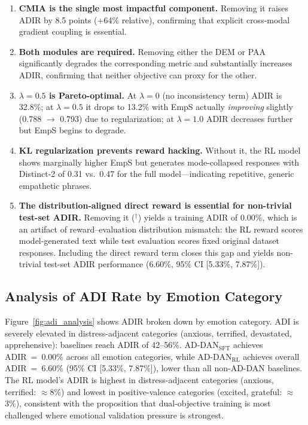\documentclass[lettersize,journal]{IEEEtran}
\begin{document}
\begin{enumerate}
\item \textbf{CMIA is the single most impactful component.}  Removing it
raises ADIR by 8.5 points (+64\% relative), confirming that explicit
cross-modal gradient coupling is essential.

\item \textbf{Both modules are required.}  Removing either the DEM or PAA
significantly degrades the corresponding metric and substantially increases
ADIR, confirming that neither objective can proxy for the other.

\item \textbf{$\lambda{=}0.5$ is Pareto-optimal.}  At $\lambda{=}0$
(no inconsistency term) ADIR is 32.8\%; at $\lambda{=}0.5$ it drops to
13.2\% with EmpS actually \emph{improving} slightly (0.788 $\to$ 0.793)
due to regularization; at $\lambda{=}1.0$ ADIR decreases further but
EmpS begins to degrade.

\item \textbf{KL regularization prevents reward hacking.}  Without it,
the RL model shows marginally higher EmpS but generates mode-collapsed
responses with Distinct-2 of 0.31 vs.\ 0.47 for the full model---indicating
repetitive, generic empathetic phrases.

\item \textbf{The distribution-aligned direct reward is essential for
non-trivial test-set ADIR.}  Removing it ($^\dagger$) yields a training
ADIR of 0.00\%, which is an artifact of reward--evaluation distribution
mismatch: the RL reward scores model-generated text while test evaluation
scores fixed original dataset responses.  Including the direct reward term
closes this gap and yields non-trivial test-set ADIR performance
(6.60\%, 95\% CI [5.33\%, 7.87\%]).
\end{enumerate}

\subsection{Analysis of ADI Rate by Emotion Category}

Figure~\ref{fig:adi_analysis} shows ADIR broken down by emotion category.
ADI is severely elevated in distress-adjacent categories
(anxious, terrified, devastated, apprehensive): baselines reach ADIR of
42--56\%.  AD-DAN$_\mathrm{SFT}$ achieves ADIR~=~0.00\% across all emotion
categories, while AD-DAN$_\mathrm{RL}$ achieves overall ADIR~=~6.60\%
(95\% CI [5.33\%, 7.87\%]), lower than all non-AD-DAN baselines.
The RL model's ADIR is highest in distress-adjacent categories
(anxious, terrified: $\approx$8\%) and lowest in positive-valence categories
(excited, grateful: $\approx$3\%), consistent with the proposition that
dual-objective training is most challenged where emotional validation pressure
is strongest.
\end{document}

